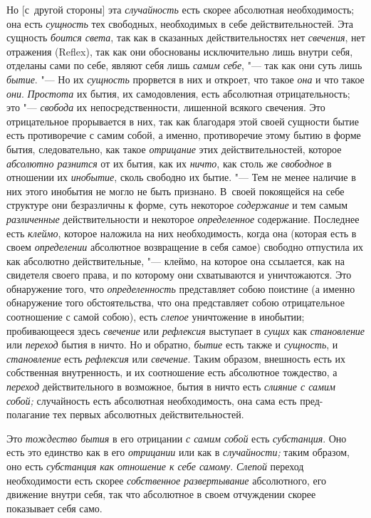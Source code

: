 Но [с~другой стороны] эта {\em случайность} есть скорее
абсолютная необходимость; она есть {\em сущность} тех
свободных, необходимых в себе действительностей. Эта сущность
{\em боится света}, так как в сказанных
действительностях нет {\em свечения}, нет отражения
(Reflex), так как они обоснованы исключительно лишь внутри себя, отделаны
сами по себе, являют себя лишь {\em самим себе}, "--- так
как они суть лишь {\em бытие}. "--- Но их
{\em сущность} прорвется в них и откроет, что такое
{\em она} и что такое {\em они}.
{\em Простота} их бытия, их самодовления, есть
абсолютная отрицательность; это "--- {\em свобода} их
непосредственности, лишенной всякого свечения. Это отрицательное
прорывается в них, так как благодаря этой своей сущности бытие есть
противоречие с самим собой, а именно, противоречие этому бытию в форме
бытия, следовательно, как такое {\em отрицание} этих
действительностей, которое {\em абсолютно разнится} от
их бытия, как их {\em ничто}, как столь же
{\em свободное} в отношении их
{\em инобытие}, сколь свободно их бытие. "--- Тем не менее
наличие в них этого инобытия не могло не быть признано. В~своей покоящейся
на себе структуре они безразличны к форме, суть некоторое
{\em содержание} и тем самым
{\em различенные} действительности и некоторое
{\em определенное} содержание. Последнее есть
{\em клеймо}, которое наложила на них необходимость,
когда она (которая есть в своем {\em определении}
абсолютное возвращение в себя самое) свободно отпустила их как абсолютно
действительные, "--- клеймо, на которое она ссылается, как на свидетеля своего
права, и по которому они схватываются и уничтожаются. Это обнаружение того,
что {\em определенность} представляет собою поистине (а
именно обнаружение того обстоятельства, что она представляет собою
отрицательное соотношение с самой собою), есть
{\em слепое} уничтожение в инобытии; пробивающееся
здесь {\em свечение} или {\em рефлексия} выступает в
{\em сущих} как {\em становление}
или {\em переход} бытия в ничто. Но и обратно, {\em бытие} есть также и
{\em сущность}, и {\em становление} есть {\em рефлексия} или
{\em свечение}. Таким образом, внешность есть их
собственная внутренность, и их соотношение есть абсолютное тождество, а
{\em переход} действительного в возможное, бытия в
ничто есть {\em слияние с самим собой;} случайность
есть абсолютная необходимость, она сама есть пред-полагание тех первых
абсолютных действительностей.

Это {\em тождество бытия} в его отрицании {\em с самим собой} есть
{\em субстанция}. Оно есть это единство как в его {\em отрицании} или
как в {\em случайности;} таким образом, оно есть {\em субстанция как
отношение к себе самому}. {\em Слепой} переход необходимости есть скорее
{\em собственное развертывание} абсолютного, его движение внутри себя,
так что абсолютное в своем отчуждении скорее показывает себя само.
